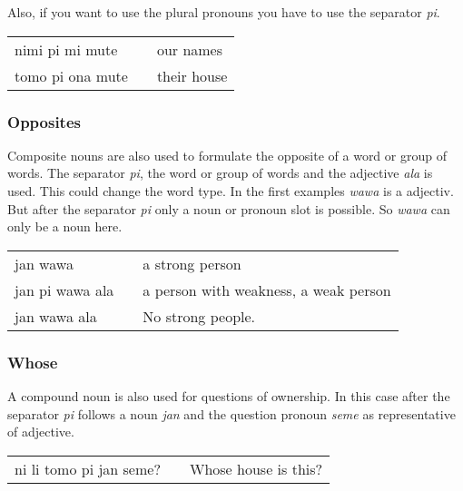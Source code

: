 Also, if you want to use the plural pronouns you have to use the separator \textit{pi}.

\begin{supertabular}{p{5,5cm}|ll}
nimi pi mi mute && our names \\
tomo pi ona mute && their house \\
\end{supertabular}  
%
\subsubsection*{Opposites}
%

Composite nouns are also used to formulate the opposite of a word or group of words. 
The separator \textit{pi}, the word or group of words and the adjective \textit{ala} is used. 
This could change the word type. 
In the first examples \textit{wawa} is a adjectiv. 
But after the separator \textit{pi} only a noun or pronoun slot is possible.
So \textit{wawa} can only be a noun here.

\begin{supertabular}{p{5,5cm}|ll}
jan wawa && a strong person \\
jan pi wawa ala && a person with weakness, a weak person \\
jan wawa ala && No strong people. \\ 
\end{supertabular}  

%
\subsubsection*{Whose} 
%

A compound noun is also used for questions of ownership. 
In this case after the separator \textit{pi} follows a noun \textit{jan} and the question pronoun \textit{seme} as representative of adjective. 

\begin{supertabular}{p{5,5cm}|ll}
ni li tomo pi jan seme? && Whose house is this? \\
\end{supertabular}

